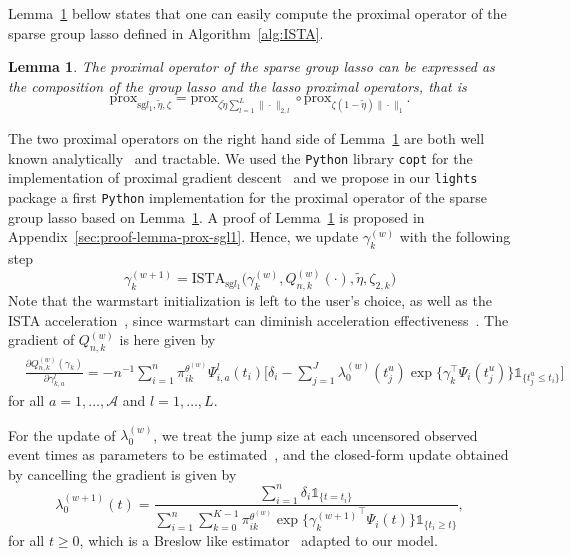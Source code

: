 \documentclass[11pt]{article}
\newtheorem{lemma}{Lemma}
\newcommand{\ind}[1]{\mathds{1}_{#1}}
\newcommand{\norm}[1]{\|#1\|}
\begin{document}
\vspace{.5cm}
Lemma~\ref{lemma:prox-sgl1} bellow states that one can easily compute the proximal operator of the sparse group lasso defined in Algorithm~\ref{alg:ISTA}.
\begin{lemma}
\label{lemma:prox-sgl1}
The proximal operator of the sparse group lasso can be expressed as the composition of the group lasso and the lasso proximal operators, that is
\normalfont
\begin{equation*}
  \text{prox}_{\text{sg} l_1,\tilde \eta, \zeta} = \text{prox}_{\zeta \tilde \eta \sum_{l=1}^L \norm{\cdot}_{2,l}} \circ \text{prox}_{\zeta (1 - \tilde \eta) \norm{\cdot}_1}.
\end{equation*}
\end{lemma}
The two proximal operators on the right hand side of Lemma~\ref{lemma:prox-sgl1} are both well known analytically~\citep{bach2011optimization} and tractable. We used the \texttt{Python} library \texttt{copt} for the implementation of proximal gradient descent~\citep{copt} and we propose in our \texttt{lights} package a first \texttt{Python} implementation for the proximal operator of the sparse group lasso based on Lemma~\ref{lemma:prox-sgl1}.
A proof of Lemma~\ref{lemma:prox-sgl1} is proposed in Appendix~\ref{sec:proof-lemma-prox-sgl1}.
Hence, we update $\gamma_k^{(w)}$ with the following step
\begin{equation}
  \label{eq:gamma-update}
  \gamma_k^{(w+1)} = \text{ISTA}_{\text{sg} l_1}\big(\gamma_k^{(w)}, Q^{(w)}_{n,k}(\cdot), \tilde \eta, \zeta_{2,k}\big)
\end{equation}
Note that the warmstart initialization is left to the user's choice, as well as the ISTA acceleration~\citep{beck2009fast}, since warmstart can diminish acceleration effectiveness~\citep{tibshirani2010proximal}. The gradient of $Q_{n,k}^{(w)}$ is here given by
\begin{align}
  \label{eq:grad-Q}
  &\frac{\partial Q_{n,k}^{(w)}(\gamma_k)}{\partial \gamma_{k,a}^l} = -n^{-1} \sum_{i=1}^n \pi_{ik}^{\theta^{(w)}} \Psi_{i, a}^l(t_i) \Big[ \delta_i - \sum_{j=1}^J \lambda_0^{(w)}(t_j^u) \exp \big\{\gamma_k^\top \Psi_i(t_j^u) \big\} \ind{\{t_j^u \leq t_i\}} \Big]
\end{align}
for all $a = 1, \ldots, \mathcal{A}$ and $l = 1, \ldots, L$.

For the update of $\lambda_0^{(w)}$, we treat the jump size at each uncensored observed event times as parameters to be estimated~\citep{klein1992semiparametric}, and the closed-form update obtained by cancelling the gradient is given by
\begin{equation}
  \label{eq:update_lambda_0}
  \lambda_0^{(w+1)}(t)= \dfrac{\sum_{i=1}^n \delta_i \ind{\{t=t_i\}}}{\sum_{i=1}^n \sum_{k=0}^{K-1} \pi_{ik}^{\theta^{(w)}} \exp \big\{{\gamma_k^{(w+1)}}^\top \Psi_i(t)\big\} \ind{\{t_i \geq t\}} },
\end{equation}
for all $t \geq 0$, which is a Breslow like estimator~\citep{breslow1972contribution} adapted to our model. 
\end{document}
